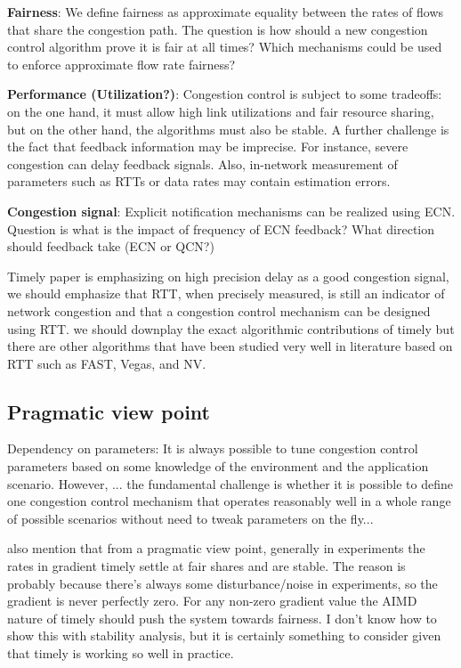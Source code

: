 {\textbf{Fairness}}: 
We define fairness as approximate equality between the rates of flows that share the congestion path. The question is how should a new congestion control algorithm prove it is fair at all times? 
Which mechanisms could be used to enforce approximate flow rate fairness?


{\textbf{Performance (Utilization?)}}: 
Congestion control is subject to some tradeoffs: on the one hand, it must allow high link utilizations and fair resource sharing, but on the other hand, the algorithms must also be stable. A further challenge is the fact that feedback information may be imprecise.  For instance, severe congestion can delay feedback signals.  Also, in-network
measurement of parameters such as RTTs or data rates may contain estimation errors. 


{\textbf{Congestion signal}}: 
 Explicit notification mechanisms can be realized using ECN. Question is what is the impact of frequency of ECN feedback? What direction should feedback take (ECN or QCN?)

Timely paper is emphasizing on high precision delay as a good congestion signal,
we should emphasize that RTT, when precisely measured, is still an indicator of
network congestion and that a congestion control mechanism can be designed using
RTT. we should downplay the exact algorithmic contributions of timely but there
are other algorithms that have been studied very well in literature based on RTT
such as FAST, Vegas, and NV.

\subsection{Pragmatic view point}

Dependency on parameters: It is always possible to tune congestion control
parameters based on some knowledge of the environment and the application
scenario. However, ... the fundamental challenge is whether it is possible to
define one congestion control mechanism that operates reasonably well in a whole
range of possible scenarios without need to tweak parameters on the fly...

also mention that from a pragmatic view point, generally in experiments the
rates in gradient timely settle at fair shares and are stable. The reason is
probably because there's always some disturbance/noise in experiments, so the
gradient is never perfectly zero. For any non-zero gradient value the AIMD
nature of timely should push the system towards fairness. I don't know how to
show this with stability analysis, but it is certainly something to consider
given that timely is working so well in practice.


